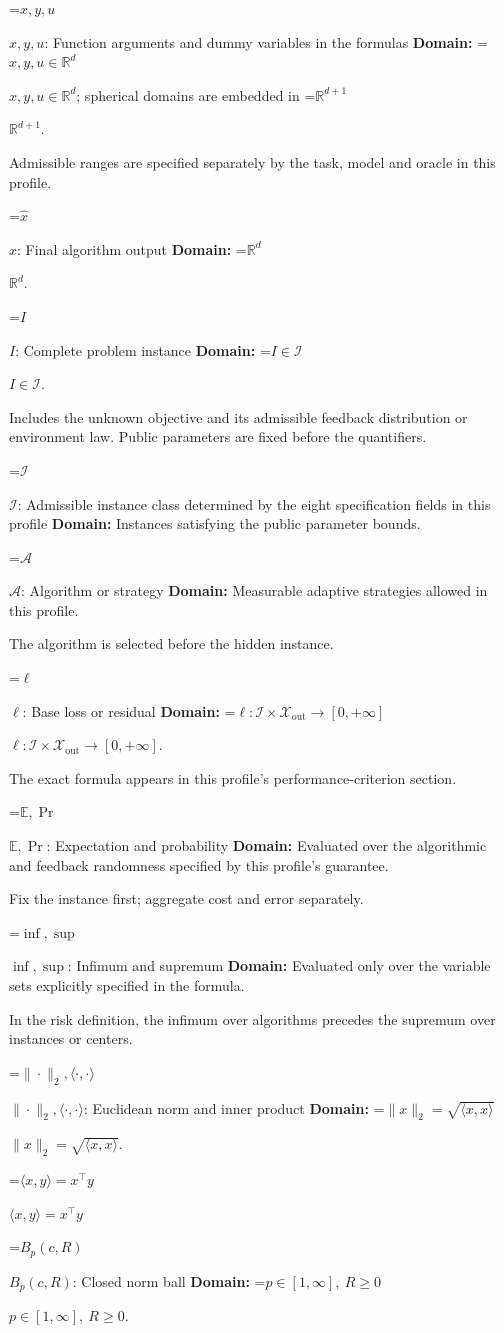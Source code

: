 \documentclass[10pt,a4paper]{article}
\newcommand{\AtlasMath}[1]{\par\begingroup\centering\setbox0=\hbox{$\displaystyle #1$}\ifdim\wd0>1.4\linewidth\typeout{ATLAS WIDE FORMULA: \the\wd0}\fi\ifdim\wd0>\linewidth\resizebox{\linewidth}{!}{\box0}\else\box0\fi\par\endgroup}
\newcommand{\AtlasInlineMath}[1]{\begingroup\setbox0=\hbox{$#1$}\ifdim\wd0>.4\linewidth\endgroup\AtlasMath{#1}\else\endgroup$#1$\fi}
\begin{document}
\AtlasInlineMath{x,y,u}: Function arguments and dummy variables in the formulas \textbf{Domain:} \AtlasInlineMath{x,y,u\in\mathbb{R}^d}; spherical domains are embedded in \AtlasInlineMath{\mathbb{R}^{d+1}}.

Admissible ranges are specified separately by the task, model and oracle in this profile.

\AtlasInlineMath{\widehat{x}}: Final algorithm output \textbf{Domain:} \AtlasInlineMath{\mathbb{R}^d}.

\AtlasInlineMath{I}: Complete problem instance \textbf{Domain:} \AtlasInlineMath{I\in\mathcal{I}}.

Includes the unknown objective and its admissible feedback distribution or environment law. Public parameters are fixed before the quantifiers.

\AtlasInlineMath{\mathcal{I}}: Admissible instance class determined by the eight specification fields in this profile \textbf{Domain:} Instances satisfying the public parameter bounds.

\AtlasInlineMath{\mathcal{A}}: Algorithm or strategy \textbf{Domain:} Measurable adaptive strategies allowed in this profile.

The algorithm is selected before the hidden instance.

\AtlasInlineMath{\ell}: Base loss or residual \textbf{Domain:} \AtlasInlineMath{\ell:\mathcal{I}\times\mathcal{X}_{\mathrm{out}}\to[0,+\infty]}.

The exact formula appears in this profile's performance-criterion section.

\AtlasInlineMath{\mathbb{E},\Pr}: Expectation and probability \textbf{Domain:} Evaluated over the algorithmic and feedback randomness specified by this profile's guarantee.

Fix the instance first; aggregate cost and error separately.

\AtlasInlineMath{\inf,\sup}: Infimum and supremum \textbf{Domain:} Evaluated only over the variable sets explicitly specified in the formula.

In the risk definition, the infimum over algorithms precedes the supremum over instances or centers.

\AtlasInlineMath{\|\cdot\|_2,\langle\cdot,\cdot\rangle}: Euclidean norm and inner product \textbf{Domain:} \AtlasInlineMath{\|x\|_2=\sqrt{\langle x,x\rangle}}.

\AtlasInlineMath{\langle x,y\rangle=x^\top y}

\AtlasInlineMath{B_p(c,R)}: Closed norm ball \textbf{Domain:} \AtlasInlineMath{p\in[1,\infty],\ R\ge0}.
\end{document}
